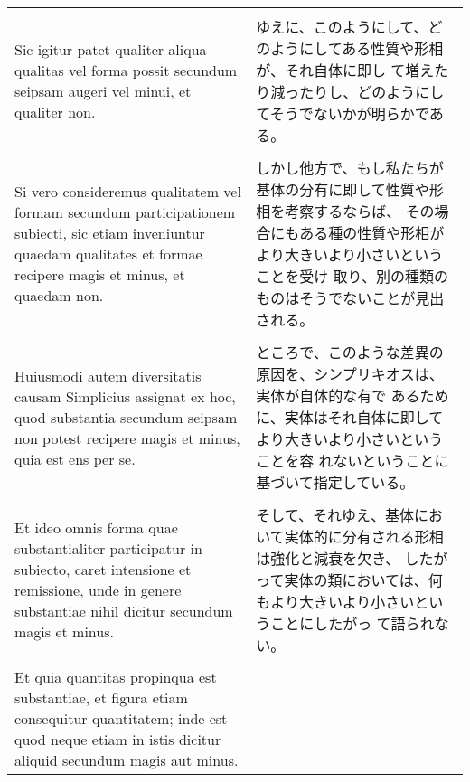 \documentclass[10pt]{jsarticle} %
\begin{document}
\begin{longtable}{p{21em}p{21em}}
\\\\


Sic igitur patet qualiter
aliqua qualitas vel forma possit secundum seipsam augeri vel minui, et
qualiter non. 


&

ゆえに、このようにして、どのようにしてある性質や形相が、それ自体に即し
 て増えたり減ったりし、どのようにしてそうでないかが明らかである。

\\\\


Si vero consideremus qualitatem vel formam secundum
participationem subiecti, sic etiam inveniuntur quaedam qualitates et
formae recipere magis et minus, et quaedam non. 


&

しかし他方で、もし私たちが基体の分有に即して性質や形相を考察するならば、
 その場合にもある種の性質や形相がより大きいより小さいということを受け
 取り、別の種類のものはそうでないことが見出される。

\\\\


Huiusmodi autem
diversitatis causam Simplicius assignat ex hoc, quod substantia
secundum seipsam non potest recipere magis et minus, quia est ens per
se. 


&

ところで、このような差異の原因を、シンプリキオスは、実体が自体的な有で
 あるために、実体はそれ自体に即してより大きいより小さいということを容
 れないということに基づいて指定している。

\\\\


Et ideo omnis forma quae substantialiter participatur in subiecto,
caret intensione et remissione, unde in genere substantiae nihil
dicitur secundum magis et minus. 


&

そして、それゆえ、基体において実体的に分有される形相は強化と減衰を欠き、
 したがって実体の類においては、何もより大きいより小さいということにしたがっ
 て語られない。

\\\\


Et quia quantitas propinqua est
substantiae, et figura etiam consequitur quantitatem; inde est quod
neque etiam in istis dicitur aliquid secundum magis aut minus. 



\end{longtable}
\end{document}
